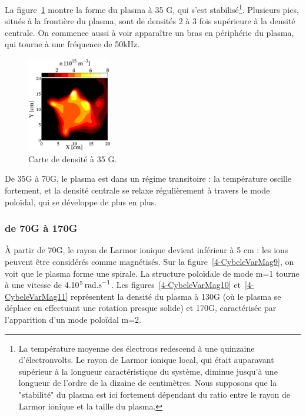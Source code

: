 \begin{refsection}
La figure~\ref{4-CybeleVarMag8} montre la forme du plasma à 35 G, qui s'est
stabilisé\footnote{La température moyenne des électrons redescend à une
quinzaine d'électronvolts. Le rayon de Larmor ionique local, qui était
auparavant supérieur à la longueur caractéristique du système, diminue
jusqu'à une longueur de l'ordre de la dizaine de centimètres. Nous supposons
que la "stabilité" du plasma est ici fortement dépendant du ratio entre le
rayon de Larmor ionique et la taille du plasma.}. Plusieurs pics, situés à la
frontière du plasma, sont de densités 2 à 3 fois supérieure à la densité centrale. On commence aussi à voir apparaître un bras en périphérie du plasma, qui tourne à une fréquence de 50kHz.
\begin{figure}[!htb]
\centering
\includegraphics[width=0.33\textwidth]{figures/4-CybeleVarMag8.eps}
{\caption{Carte de densité à 35 G.}
\label{4-CybeleVarMag8}}
\end{figure}

De 35G à 70G, le plasma est dans un régime transitoire : la température
oscille fortement, et la densité centrale se relaxe régulièrement à travers 
le mode poloïdal, qui se développe de plus en plus.

\subsubsection{de 70G à 170G}
À partir de 70G, le rayon de Larmor ionique devient inférieur à 5 cm : les ions
peuvent être considérés comme magnétisés.
Sur la figure~\ref{4-CybeleVarMag9}, on voit que le
plasma forme une spirale. La structure poloïdale de mode m=1 tourne à une
vitesse de 4.10$^{{5}}\,\text{rad.s}^{{-1}}$. Les
figures~\ref{4-CybeleVarMag10} et~\ref{4-CybeleVarMag11} représentent la densité
du plasma à 130G (où le plasma se déplace en effectuant une rotation presque
solide) et 170G, caractérisée par l'apparition d'un mode poloïdal m=2. 


\end{refsection}
